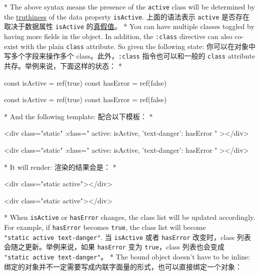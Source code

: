 \begin{paracol}{2}
\switchcolumn[0]*%
The above syntax means the presence of the \texttt{active} class will be
determined by the
\href{https://developer.mozilla.org/en-US/docs/Glossary/Truthy}{truthiness}
of the data property \texttt{isActive}.
\switchcolumn
上面的语法表示 \texttt{active} 是否存在取决于数据属性 \texttt{isActive}
的\href{https://developer.mozilla.org/en-US/docs/Glossary/Truthy}{真假值}。
\switchcolumn[0]*%
You can have multiple classes toggled by having more fields in the
object. In addition, the \texttt{:class} directive can also co-exist
with the plain \texttt{class} attribute. So given the following state:
\switchcolumn
你可以在对象中写多个字段来操作多个 class。此外，\texttt{:class}
指令也可以和一般的 \texttt{class} attribute
共存。举例来说，下面这样的状态：
\switchcolumn[0]*%
\begin{codeJs}
const isActive = ref(true)
const hasError = ref(false)
\end{codeJs}
\switchcolumn
\begin{codeJs}
const isActive = ref(true)
const hasError = ref(false)
\end{codeJs}
\switchcolumn[0]*%
And the following template:
\switchcolumn
配合以下模板：
\switchcolumn[0]*%
\begin{codeHtml}
<div
  class="static"
  :class="{ active: isActive, 'text-danger': hasError }"
></div>
\end{codeHtml}
\switchcolumn
\begin{codeHtml}
<div
  class="static"
  :class="{ active: isActive, 'text-danger': hasError }"
></div>
\end{codeHtml}
\switchcolumn[0]*%
It will render:
\switchcolumn
渲染的结果会是：
\switchcolumn[0]*%
\begin{codeHtml}
<div class="static active"></div>
\end{codeHtml}
\switchcolumn
\begin{codeHtml}
<div class="static active"></div>
\end{codeHtml}
\switchcolumn[0]*%
When \texttt{isActive} or \texttt{hasError} changes, the class list will
be updated accordingly. For example, if \texttt{hasError} becomes
\texttt{true}, the class list will become
\texttt{"static\ active\ text-danger"}.
\switchcolumn
当 \texttt{isActive} 或者 \texttt{hasError} 改变时，class
列表会随之更新。举例来说，如果 \texttt{hasError} 变为
\texttt{true}，class 列表也会变成
\texttt{"static\ active\ text-danger"}。
\switchcolumn[0]*%
The bound object doesn't have to be inline:
\switchcolumn
绑定的对象并不一定需要写成内联字面量的形式，也可以直接绑定一个对象：


\end{paracol}
